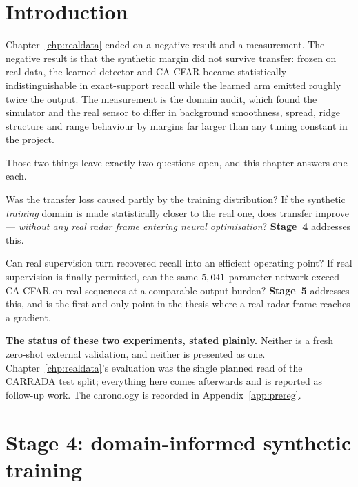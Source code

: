 
\section{Introduction}

Chapter~\ref{chp:realdata} ended on a negative result and a measurement. The negative result is that
the synthetic margin did not survive transfer: frozen on real data, the learned detector and CA-CFAR
became statistically indistinguishable in exact-support recall while the learned arm emitted roughly
twice the output. The measurement is the domain audit, which found the simulator and the real sensor
to differ in background smoothness, spread, ridge structure and range behaviour by margins far larger
than any tuning constant in the project.

Those two things leave exactly two questions open, and this chapter answers one each.

\begin{description}
\itemsep3pt
\item[Question 1 --- the training distribution.] Was the transfer loss caused partly by the
training distribution? If the synthetic \emph{training} domain is made statistically closer to the
real one, does transfer improve --- \emph{without any real radar frame entering neural
optimisation}? \textbf{Stage~4} addresses this.
\item[Question 2 --- real supervision.] Can real supervision turn recovered recall into an efficient
operating point? If real supervision is finally permitted, can the same
$5,041$-parameter network exceed CA-CFAR on real sequences at a comparable output burden?
\textbf{Stage~5} addresses this, and is the first and only point in the thesis where a real radar
frame reaches a gradient.
\end{description}

\textbf{The status of these two experiments, stated plainly.} Neither is a fresh zero-shot external
validation, and neither is presented as one. Chapter~\ref{chp:realdata}'s evaluation was the single
planned read of the CARRADA test split; everything here comes afterwards and is reported as
follow-up work. The chronology is recorded in Appendix~\ref{app:prereg}.

\section{Stage 4: domain-informed synthetic training}
\label{sec:stage4}

